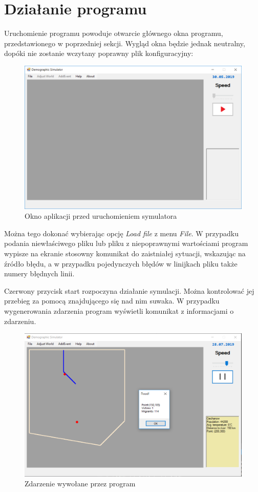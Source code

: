 \documentclass[a4paper,12pt]{article}
\newcommand\tab[1][0.6cm]{\hspace*{#1} }
\begin{document}
\section{Działanie programu}

\tab Uruchomienie programu powoduje otwarcie głównego okna programu, przedstawionego w poprzedniej sekcji. Wygląd okna będzie jednak neutralny, dopóki nie zostanie wczytany poprawny plik konfiguracyjny:

\begin{figure}[H]
  \centering
  \includegraphics[width=\textwidth]{offline}  
  \caption{Okno aplikacji przed uruchomieniem symulatora}
  \label{fig:off}
\end{figure}

\tab Można tego dokonać wybierając opcję \textit{Load file} z menu \textit{File}. W przypadku podania niewłaściwego pliku lub pliku z niepoprawnymi wartościami program wypisze na ekranie stosowny komunikat do zaistniałej sytuacji, wskazując na źródło błędu, a w przypadku pojedynczych błędów w linijkach pliku także numery błędnych linii.

Czerwony przycisk start rozpoczyna działanie symulacji. Można kontrolować jej przebieg za pomocą znajdującego się nad nim suwaka. W przypadku wygenerowania zdarzenia program wyświetli komunikat z informacjami o zdarzeniu.

\begin{figure}[H]
  \centering
  \includegraphics[width=\textwidth]{evt}
  \caption{Zdarzenie wywołane przez program}
  \label{fig:evt}
\end{figure}
\end{document}
